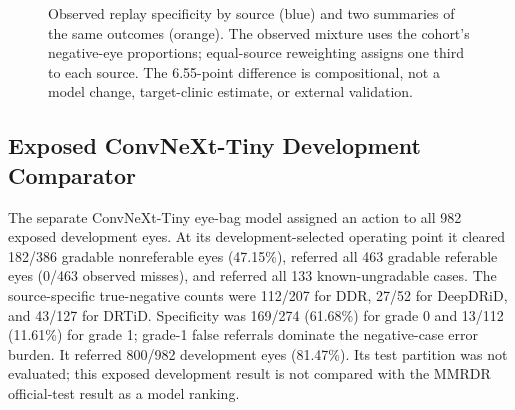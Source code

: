 \documentclass{ieeeaccess}
\begin{document}
\begin{figure}[t]
\centering
{}
\caption{Observed replay specificity by source (blue) and two summaries of the same outcomes (orange). The observed mixture uses the cohort's negative-eye proportions; equal-source reweighting assigns one third to each source. The 6.55-point difference is compositional, not a model change, target-clinic estimate, or external validation.}
\label{fig:source-mixture}
\end{figure}

\subsection{Exposed ConvNeXt-Tiny Development Comparator}
The separate ConvNeXt-Tiny eye-bag model assigned an action to all 982 exposed development eyes. At its development-selected operating point it cleared 182/386 gradable nonreferable eyes (47.15\%), referred all 463 gradable referable eyes (0/463 observed misses), and referred all 133 known-ungradable cases. The source-specific true-negative counts were 112/207 for DDR, 27/52 for DeepDRiD, and 43/127 for DRTiD. Specificity was 169/274 (61.68\%) for grade 0 and 13/112 (11.61\%) for grade 1; grade-1 false referrals dominate the negative-case error burden. It referred 800/982 development eyes (81.47\%). Its test partition was not evaluated; this exposed development result is not compared with the MMRDR official-test result as a model ranking.
\end{document}
